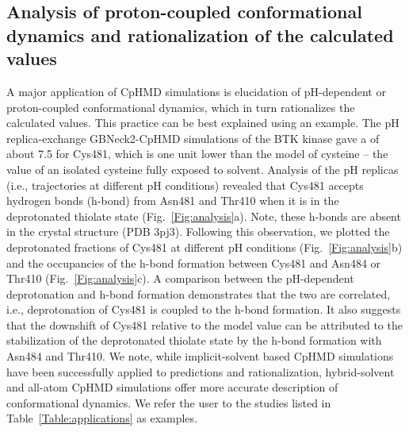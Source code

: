 \subsection{Analysis of proton-coupled conformational dynamics and 
rationalization of the calculated {\pka} values}
A major application of 
CpHMD simulations is 
elucidation of pH-dependent or proton-coupled conformational dynamics, which 
in turn rationalizes the calculated {\pka} values. 
This practice can be best explained using an example. 
The pH replica-exchange GBNeck2-CpHMD simulations 
of the BTK kinase
\cite{Liu_Shen_2021_J.Med.Chem.}
gave a {\pka} of about 7.5 for Cys481,
which is one unit lower than the 
model {\pka} of cysteine -- the {\pka} value of an isolated cysteine 
fully exposed to solvent.
Analysis of the pH replicas (i.e., trajectories at different pH conditions) 
revealed that Cys481 accepts hydrogen bonds (h-bond) from 
Asn481 and Thr410 when it is in the deprotonated 
thiolate state (Fig.~\ref{Fig:analysis}a).
Note, these h-bonds are absent in the crystal structure (PDB 3pj3).
Following this observation, we plotted the deprotonated fractions 
of Cys481 at different pH conditions (Fig.~\ref{Fig:analysis}b)
and the occupancies of the h-bond formation 
between Cys481 and Asn484 or Thr410
(Fig.~\ref{Fig:analysis}c).
A comparison between the pH-dependent deprotonation
and h-bond formation demonstrates that the two are correlated, i.e., 
deprotonation of Cys481 is coupled to the h-bond formation.
It also suggests that the {\pka} downshift of Cys481 relative to the model value
can be attributed to the stabilization of the deprotonated thiolate state 
by the h-bond formation with Asn484 and Thr410.
We note, while implicit-solvent based CpHMD simulations have been 
successfully applied to {\pka} predictions and rationalization, 
hybrid-solvent and all-atom CpHMD simulations offer more accurate 
description of conformational dynamics.
We refer the user to the studies listed in Table~\ref{Table:applications} as examples.  


